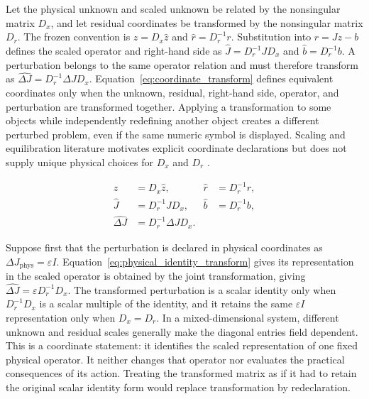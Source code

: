 \documentclass[preprint,12pt]{elsarticle}
\theoremstyle{definition}
\begin{document}
Let the physical unknown and scaled unknown be related by the nonsingular matrix $D_x$, and let residual coordinates be transformed by the nonsingular matrix $D_r$. The frozen convention is $z = D_x \widehat z$ and $\widehat r = D_r^{-1} r$. Substitution into $r = Jz-b$ defines the scaled operator and right-hand side as $\widehat J = D_r^{-1} J D_x$ and $\widehat b = D_r^{-1}b$. A perturbation belongs to the same operator relation and must therefore transform as $\widehat{\Delta J} = D_r^{-1} \Delta J D_x$. Equation~\eqref{eq:coordinate_transform} defines equivalent coordinates only when the unknown, residual, right-hand side, operator, and perturbation are transformed together. Applying a transformation to some objects while independently redefining another object creates a different perturbed problem, even if the same numeric symbol is displayed. Scaling and equilibration literature motivates explicit coordinate declarations but does not supply unique physical choices for $D_x$ and $D_r$ \cite{S05,S06,S07,S08}.

\begin{linenomath*}
\begin{equation}
\begin{aligned}
z&=D_x\widehat z, & \widehat r&=D_r^{-1}r,\\
\widehat J&=D_r^{-1}JD_x, & \widehat b&=D_r^{-1}b,\\
\widehat{\Delta J}&=D_r^{-1}\Delta J D_x.
\end{aligned}
\label{eq:coordinate_transform}
\end{equation}
\end{linenomath*}

Suppose first that the perturbation is declared in physical coordinates as $\Delta J_{\mathrm{phys}} = \varepsilon I$. Equation~\eqref{eq:physical_identity_transform} gives its representation in the scaled operator is obtained by the joint transformation, giving $\widehat{\Delta J} = \varepsilon D_r^{-1}D_x$. The transformed perturbation is a scalar identity only when $D_r^{-1}D_x$ is a scalar multiple of the identity, and it retains the same $\varepsilon I$ representation only when $D_x = D_r$. In a mixed-dimensional system, different unknown and residual scales generally make the diagonal entries field dependent. This is a coordinate statement: it identifies the scaled representation of one fixed physical operator. It neither changes that operator nor evaluates the practical consequences of its action. Treating the transformed matrix as if it had to retain the original scalar identity form would replace transformation by redeclaration.
\end{document}
